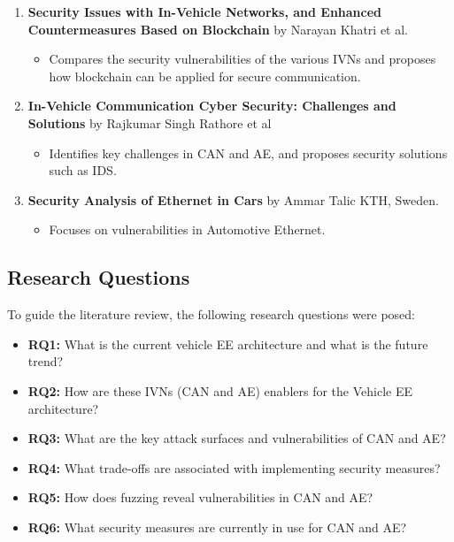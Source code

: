 \documentclass{report}
\begin{document}
\begin{enumerate}
    \item \textbf{Security Issues with In-Vehicle Networks, and Enhanced Countermeasures Based on Blockchain} by Narayan Khatri et al.
    \begin{itemize}
        \item Compares the security vulnerabilities of the various IVNs and proposes how blockchain can be applied for secure communication.
    \end{itemize}
    \item \textbf{In-Vehicle Communication Cyber Security: Challenges and Solutions} by Rajkumar Singh Rathore et al
    \begin{itemize}
        \item Identifies key challenges in CAN and AE, and proposes security solutions such as IDS.
    \end{itemize}
    \item \textbf{Security Analysis of Ethernet in Cars} by Ammar Talic KTH, Sweden.
    \begin{itemize}
        \item Focuses on vulnerabilities in Automotive Ethernet.
    \end{itemize}
\end{enumerate}

\subsection{Research Questions}
To guide the literature review, the following research questions were posed:

\begin{itemize}
    \item \textbf{RQ1:} What is the current vehicle EE architecture and what is the future trend?
    \item \textbf{RQ2:} How are these IVNs (CAN and AE) enablers for the Vehicle EE architecture?
    \item \textbf{RQ3:} What are the key attack surfaces and vulnerabilities of CAN and AE?
    \item \textbf{RQ4:} What trade-offs are associated with implementing security measures?
    \item \textbf{RQ5:} How does fuzzing reveal vulnerabilities in CAN and AE?
    \item \textbf{RQ6:} What security measures are currently in use for CAN and AE?
\end{itemize}
\end{document}
